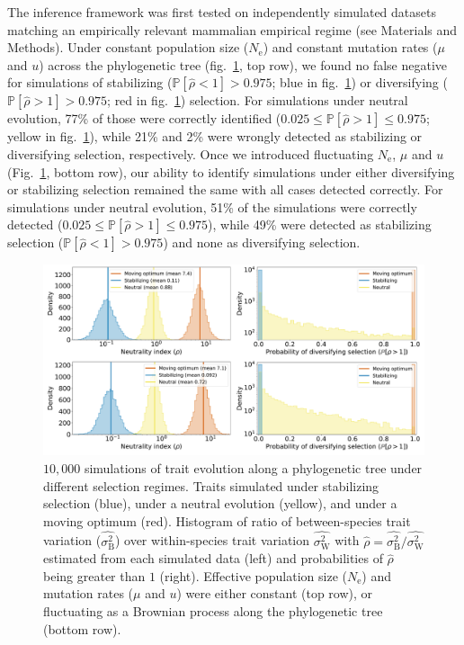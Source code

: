 \documentclass{article}
\newcommand{\Ne}{N_{\text{e}}}
\newcommand{\proba}{\mathbb{P}}
\newcommand{\MutationRatePheno}{\mu}
\newcommand{\MutationRateNuc}{u}
\newcommand{\RateBetween}{\sigma^2_{\mathrm{B}}}
\newcommand{\RateWhithin}{\sigma^2_{\mathrm{W}}}
\newcommand{\EstRateBetween}{\widehat{\RateBetween}}
\newcommand{\EstRateWhithin}{\widehat{\RateWhithin}}
\newcommand{\EstNI}{\widehat{\rho}}
\begin{document}
The inference framework was first tested on independently simulated datasets matching an empirically relevant mammalian empirical regime (see Materials and Methods).
Under constant population size ($\Ne$) and constant mutation rates ($\MutationRatePheno$ and $\MutationRateNuc$) across the phylogenetic tree (fig.~\ref{fig:results-simulations}, top row), we found no false negative for simulations of stabilizing ($\proba [\EstNI < 1] > 0.975$; blue in fig.~\ref{fig:results-simulations}) or diversifying ($\proba [\EstNI > 1] > 0.975$; red in fig.~\ref{fig:results-simulations}) selection.
For simulations under neutral evolution, 77\% of those were correctly identified ($0.025 \leq \proba [\EstNI > 1] \leq 0.975$; yellow in fig.~\ref{fig:results-simulations}), while 21\% and 2\% were wrongly detected as stabilizing or diversifying selection, respectively.
Once we introduced fluctuating $\Ne$, $\MutationRatePheno$ and $\MutationRateNuc$(Fig.~\ref{fig:results-simulations}, bottom row), our ability to identify simulations under either diversifying or stabilizing selection remained the same with all cases detected correctly.
For simulations under neutral evolution, 51\% of the simulations were correctly detected ($0.025 \leq \proba [\EstNI > 1] \leq 0.975$), while 49\% were detected as stabilizing selection ($\proba [\EstNI < 1] > 0.975$) and none as diversifying selection.

\begin{figure}[!ht]
    \centering
    \includegraphics[width=\textwidth, page=1] {figure3}
    \caption{
        $10,000$ simulations of trait evolution along a phylogenetic tree under different selection regimes.
        Traits simulated under stabilizing selection (blue), under a neutral evolution (yellow), and under a moving optimum (red).
        Histogram of ratio of between-species trait variation ($\EstRateBetween$) over within-species trait variation $\EstRateWhithin$ with $\EstNI = \EstRateBetween / \EstRateWhithin$ estimated from each simulated data (left) and probabilities of $\EstNI$ being greater than $1$ (right).
        Effective population size ($\Ne$) and mutation rates ($\MutationRatePheno$ and $\MutationRateNuc$) were either constant (top row), or fluctuating as a Brownian process along the phylogenetic tree (bottom row).
    }
    \label{fig:results-simulations}
\end{figure}
\end{document}
